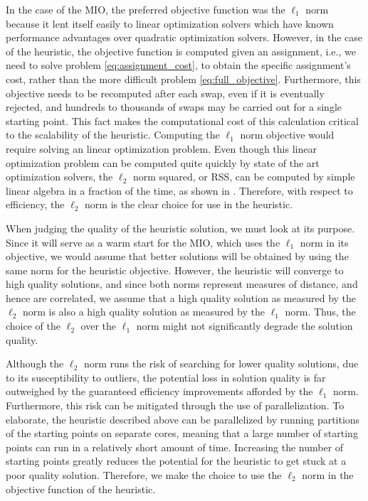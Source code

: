 In the case of the MIO, the preferred objective function was the  $\ell_1$ norm because it lent itself easily to linear optimization solvers which have known performance advantages over quadratic optimization solvers. However, in the case of the heuristic, the objective function is computed given an assignment, i.e., we need to solve problem \eqref{eq:assignment_cost}, to obtain the specific assignment's cost, rather than the more difficult problem \eqref{eq:full_objective}. Furthermore, this objective needs to be recomputed after each swap, even if it is eventually rejected, and hundreds to thousands of swaps may be carried out for a single starting point. This fact makes the computational cost of this calculation critical to the scalability of the heuristic.  Computing the $\ell_1$ norm objective would require solving an linear optimization problem. Even though this linear optimization problem can be computed quite quickly by state of the art optimization solvers, the $\ell_2$ norm squared, or RSS, can be computed by simple linear algebra in a fraction of the time, as shown in \cite{RSS-Matrix}. Therefore, with respect to efficiency, the $\ell_2$ norm is the clear choice for use in the heuristic.

When judging the quality of the heuristic solution, we must look at its purpose. Since it will serve as a warm start for the MIO, which uses the $\ell_1$ norm in its objective, we would assume that better solutions will be obtained by using the same norm for the heuristic objective. However, the heuristic will converge to high quality solutions, and since both norms represent measures of distance, and hence are correlated, we assume that a high quality solution as measured by the $\ell_2$ norm is also a high quality solution as measured by the $\ell_1$ norm. Thus, the choice of the $\ell_2$ over the $\ell_1$ norm might not significantly degrade the solution quality.

Although the $\ell_2$ norm runs the risk of searching for lower quality solutions, due to its susceptibility to outliers, the potential loss in solution quality is far outweighed by the guaranteed efficiency improvements afforded by the $\ell_1$ norm. Furthermore, this risk can be mitigated through the use of parallelization. To elaborate, the heuristic described above can be parallelized by running partitions of the starting points on separate cores, meaning that a large number of starting points can run in a relatively short amount of time. Increasing the number of starting points greatly reduces the potential for the heuristic to get stuck at a poor quality solution. Therefore, we make the choice to use the $\ell_2$ norm in the objective function of the heuristic. 